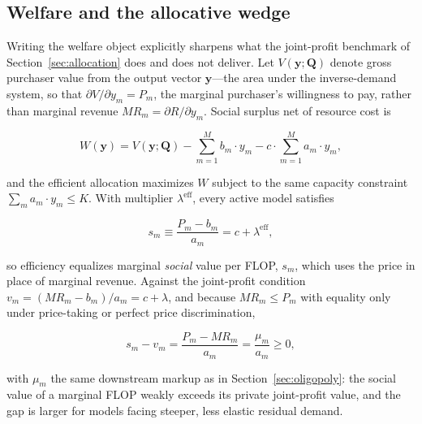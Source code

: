 \documentclass[11pt]{article}
\begin{document}
\subsection{Welfare and the allocative wedge}
\label{sec:welfare}

Writing the welfare object explicitly sharpens what the joint-profit benchmark of Section~\ref{sec:allocation} does and does not deliver. Let $V(\mathbf y;\mathbf Q)$ denote gross purchaser value from the output vector $\mathbf y$---the area under the inverse-demand system, so that $\partial V/\partial y_m=P_m$, the marginal purchaser's willingness to pay, rather than marginal revenue $MR_m=\partial R/\partial y_m$. Social surplus net of resource cost is

\begin{equation}W(\mathbf y)=V(\mathbf y;\mathbf Q)-\sum_{m=1}^{M}b_m\cdot y_m-c\cdot\sum_{m=1}^{M}a_m\cdot y_m,\end{equation}

and the efficient allocation maximizes $W$ subject to the same capacity constraint $\sum_m a_m\cdot y_m\leq K$. With multiplier $\lambda^{\mathrm{eff}}$, every active model satisfies

\begin{equation}s_m\equiv\frac{P_m-b_m}{a_m}=c+\lambda^{\mathrm{eff}},\end{equation}

so efficiency equalizes marginal \emph{social} value per FLOP, $s_m$, which uses the price in place of marginal revenue. Against the joint-profit condition $v_m=(MR_m-b_m)/a_m=c+\lambda$, and because $MR_m\leq P_m$ with equality only under price-taking or perfect price discrimination,

\begin{equation}s_m-v_m=\frac{P_m-MR_m}{a_m}=\frac{\mu_m}{a_m}\geq0,\end{equation}

with $\mu_m$ the same downstream markup as in Section~\ref{sec:oligopoly}: the social value of a marginal FLOP weakly exceeds its private joint-profit value, and the gap is larger for models facing steeper, less elastic residual demand.
\end{document}
